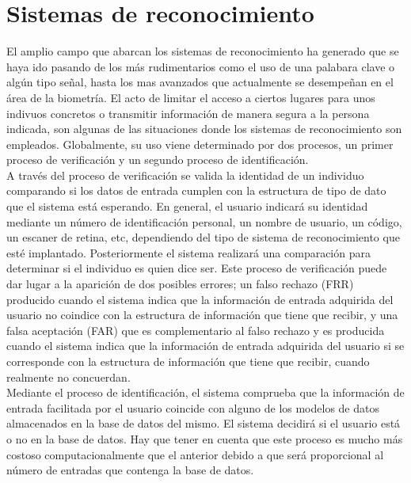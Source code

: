 
\section{Sistemas de reconocimiento}

El amplio campo que abarcan los sistemas de reconocimiento ha generado que se haya ido pasando de los más rudimentarios como el uso de una palabara clave o algún tipo señal, hasta los mas avanzados que actualmente se desempeñan en el área de la biometría. El acto de limitar el acceso a ciertos lugares para unos indivuos concretos o transmitir información de manera segura a la persona indicada, son algunas de las situaciones donde los sistemas de reconocimiento son empleados. Globalmente, su uso viene determinado por dos procesos, un primer proceso de verificación y un segundo proceso de identificación. \\

A través del proceso de verificación se valida la identidad de un individuo comparando si los datos de entrada cumplen con la estructura de tipo de dato que el sistema está esperando. En general, el usuario indicará su identidad mediante un número de identificación personal, un nombre de usuario, un código, un escaner de retina, etc, dependiendo del tipo de sistema de reconocimiento que esté implantado. Posteriormente el sistema realizará una comparación para determinar si el individuo es quien dice ser. Este proceso de verificación puede dar lugar a la aparición de dos posibles errores; un falso rechazo (FRR) producido cuando el sistema indica que la información de entrada adquirida del usuario no coindice con la estructura de información que tiene que recibir, y una falsa aceptación (FAR) que es complementario al falso rechazo y es producida cuando el sistema indica que la información de entrada adquirida del usuario si se corresponde con la estructura de información que tiene que recibir, cuando realmente no concuerdan.  \\

Mediante el proceso de identificación, el sistema comprueba que la información de entrada facilitada por el usuario coincide con alguno de los modelos de datos almacenados en la base de datos del mismo. El sistema decidirá si el usuario está o no en la base de datos. Hay que tener en cuenta que este proceso es mucho más costoso computacionalmente que el anterior debido a que será proporcional al número de entradas que contenga la base de datos. \\

